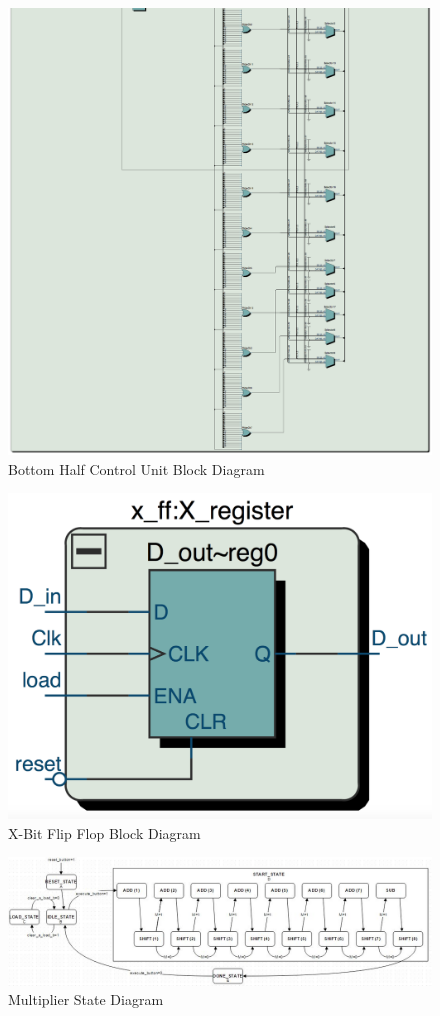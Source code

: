 \documentclass[journal, twocolumn, final,11pt,letterpaper]{IEEEtran}
\begin{document}
\begin{figure} [htbp]
	\centering
	\includegraphics[scale=0.65]{control-unit-bottom-half-diagram.png}
	\caption{Bottom Half Control Unit Block Diagram\label{fig:bottom-half-control}}
\end{figure}

\begin{figure} [htbp]
	\centering
	\includegraphics[scale=0.4]{x-ff-diagram.png}
	\caption{X-Bit Flip Flop Block Diagram\label{fig:x-ff-diagram}}
\end{figure}

\begin{figure} [htbp]
	\centering
	\includegraphics[scale=0.65]{FSM.jpg}
	\caption{Multiplier State Diagram\label{fig:FSM}}
\end{figure}




\end{document}

